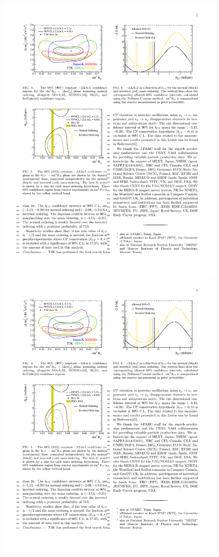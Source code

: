 \begin{figure}[htbp]
\begin{minipage}[c]{.46\linewidth}
   	      \includegraphics[width=0.9\linewidth]{figures/t2k_joint_th13dcp.pdf}
   \end{minipage} \hfill
   \begin{minipage}{.46\linewidth}
      \includegraphics[width=0.9\linewidth]{figures/t2k_dcp_1D.pdf}

\end{minipage}
\end{figure}
